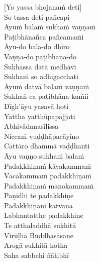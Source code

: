 [Yo yassa bhojanaṁ deti]\\
So tassa deti pañcapi\\
Āyuṁ balaṁ sukhaṁ vaṇṇaṁ\\
Paṭibhānañca pañcamaṁi\\
Āyu-do bala-do dhīro\\
Vaṇṇa-do paṭibhāṇa-do\\
Sukhassa dātā medhāvī\\
Sukhaṁ so adhigacchati\\
Āyuṁ datvā balaṁ vaṇṇaṁ\\
Sukhañ-ca paṭibhāna-kaṁii\\
Dīgh’āyu yasavā hoti\\
Yattha yatthūpapajjati\\
Abhivādanasīlissa\\
Niccaṁ vuḍḍhāpacāyino\\
Cattāro dhammā vaḍḍhanti\\
Āyu vaṇṇo sukhaṁ balaṁ\\
Padakkhiṇaṁ kāyakammaṁ\\
Vācākammaṁ padakkhiṇaṁ\\
Padakkhiṇaṁ manokammaṁ\\
Paṇīdhi te padakkhiṇe\\
Padakkhiṇāni katvāna\\
Labhantatthe padakkhiṇe\\
Te atthaladdhā sukhitā\\
Virūḷhā Buddhasāsane\\
Arogā sukhitā hotha\\
Saha sabbehi ñātibhī

